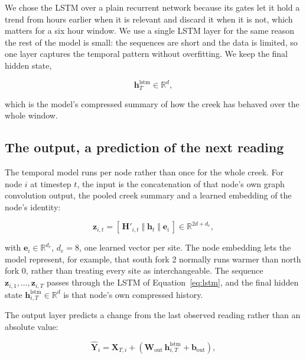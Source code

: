\documentclass{article}
\begin{document}
We chose the LSTM over a plain recurrent network because its gates let it hold
a trend from hours earlier when it is relevant and discard it when it is not,
which matters for a six hour window. We use a single LSTM layer for the same
reason the rest of the model is small: the sequences are short and the data is
limited, so one layer captures the temporal pattern without overfitting. We
keep the final hidden state,

\begin{equation}
  \label{eq:final-state}
  \mathbf{h}_T^{\text{lstm}} \in \mathbb{R}^{d},
\end{equation}

which is the model's compressed summary of how the creek has behaved over the
whole window.

\subsection{The output, a prediction of the next reading}
\label{sec:output}

The temporal model runs per node rather than once for the whole creek. For node
$i$ at timestep $t$, the input is the concatenation of that node's own graph
convolution output, the pooled creek summary and a learned embedding of the
node's identity:

\begin{equation}
  \label{eq:lstm-input}
  \mathbf{z}_{i,t} = \left[\, \mathbf{H}'_{i,t} \;\Vert\; \mathbf{h}_t \;\Vert\; \mathbf{e}_i \,\right] \in \mathbb{R}^{2d + d_e},
\end{equation}

with $\mathbf{e}_i \in \mathbb{R}^{d_e}$, $d_e = 8$, one learned vector per
site. The node embedding lets the model represent, for example, that south fork
2 normally runs warmer than north fork 0, rather than treating every site as
interchangeable. The sequence $\mathbf{z}_{i,1}, \dots, \mathbf{z}_{i,T}$
passes through the LSTM of Equation~\ref{eq:lstm}, and the final hidden state
$\mathbf{h}_{i,T}^{\text{lstm}} \in \mathbb{R}^{d}$ is that node's own
compressed history.

The output layer predicts a change from the last observed reading rather than an
absolute value:

\begin{equation}
  \label{eq:output}
  \hat{\mathbf{Y}}_i = \mathbf{X}_{T,i} + \left( \mathbf{W}_{\text{out}} \, \mathbf{h}_{i,T}^{\text{lstm}} + \mathbf{b}_{\text{out}} \right),
\end{equation}
\end{document}
